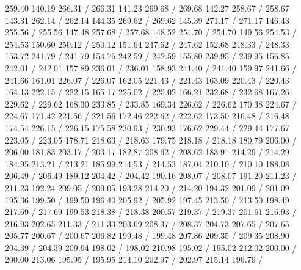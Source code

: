 { 259.40 140.19 266.31 /
 266.31 141.23 269.68 /
 269.68 142.27 258.67 /
 258.67 143.31 262.14 /
 262.14 144.35 269.62 /
 269.62 145.39 271.17 /
 271.17 146.43 255.56 /
 255.56 147.48 257.68 /
 257.68 148.52 254.70 /
 254.70 149.56 254.53 /
 254.53 150.60 250.12 /
 250.12 151.64 247.62 /
 247.62 152.68 248.33 /
 248.33 153.72 241.79 /
 241.79 154.76 242.59 /
 242.59 155.80 239.95 /
 239.95 156.85 242.01 /
 242.01 157.89 236.01 /
 236.01 158.93 241.40 /
 241.40 159.97 241.66 /
 241.66 161.01 226.07 /
 226.07 162.05 221.43 /
 221.43 163.09 220.43 /
 220.43 164.13 222.15 /
 222.15 165.17 225.02 /
 225.02 166.21 232.68 /
 232.68 167.26 229.62 /
 229.62 168.30 233.85 /
 233.85 169.34 226.62 /
 226.62 170.38 224.67 /
 224.67 171.42 221.56 /
 221.56 172.46 222.62 /
 222.62 173.50 216.48 /
 216.48 174.54 226.15 /
 226.15 175.58 230.93 /
 230.93 176.62 229.44 /
 229.44 177.67 223.05 /
 223.05 178.71 218.63 /
 218.63 179.75 218.18 /
 218.18 180.79 206.00 /
 206.00 181.83 203.17 /
 203.17 182.87 208.62 /
 208.62 183.91 214.29 /
 214.29 184.95 213.21 /
 213.21 185.99 214.53 /
 214.53 187.04 210.10 /
 210.10 188.08 206.49 /
 206.49 189.12 204.42 /
 204.42 190.16 208.07 /
 208.07 191.20 211.23 /
 211.23 192.24 209.05 /
 209.05 193.28 214.20 /
 214.20 194.32 201.09 /
 201.09 195.36 199.50 /
 199.50 196.40 205.92 /
 205.92 197.45 213.50 /
 213.50 198.49 217.69 /
 217.69 199.53 218.38 /
 218.38 200.57 219.37 /
 219.37 201.61 216.93 /
 216.93 202.65 211.33 /
 211.33 203.69 208.37 /
 208.37 204.73 207.65 /
 207.65 205.77 200.67 /
 200.67 206.82 199.48 /
 199.48 207.86 209.35 /
 209.35 208.90 204.39 /
 204.39 209.94 198.02 /
 198.02 210.98 195.02 /
 195.02 212.02 200.00 /
 200.00 213.06 195.95 /
 195.95 214.10 202.97 /
 202.97 215.14 196.79 /
}
